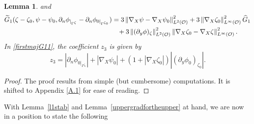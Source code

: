 \documentclass[11pt]{article}
\newtheorem{lemma}[theorem]{Lemma}
\begin{document}
\begin{lemma}
	and 
	\begin{equation}\label{firstmajG12}
		\begin{split}
			\widetilde{G}_1(\zeta-\zeta_0, \psi-\psi_0 ,\partial_n\phi_{|_{\Gamma^{\zeta  }     }}-\partial_n\phi_{0|_{\Gamma^{\zeta_0    }   }} )&=3\left\Vert \nabla_X\psi-\nabla_X\psi_0  \right\Vert_{L^{2}(\mathcal O )}^2+3\left\Vert \nabla_X\zeta_0 \right\Vert_{L^{\infty}(\mathcal O )}^2\widehat{G}_1\\
			&\hspace{0.3cm}+3 \left\Vert (\partial_y\phi)_{\zeta} \right\Vert_{L^{2}(\mathcal O )}^2 \left\Vert \nabla_X\zeta_0-\nabla_X\zeta   \right\Vert_{L^{\infty}(\mathcal O )}^2.\\
		\end{split}
	\end{equation}
	In  \eqref{firstmajG11}, the coefficient $z_3$ is given  by 
	\begin{equation}\label{z1z2z3}
			z_3=\left| \partial_n\phi_{0|_{\Gamma^{\zeta_0       }}} \right|+ \left|\nabla_X\psi_0  \right|+(1+\left| \nabla_X\zeta_0  \right|)\left|(\partial_y\phi_0)_{\zeta_0}  \right|.
	\end{equation}
\end{lemma}
\begin{proof} The proof results from simple (but cumbersome) computations. It is shifted to Appendix \ref {A.1} for ease of reading.  
\end{proof}
With Lemma~\ref{l1stab} and Lemma~\ref{uppergradfortheupper} at hand, we are now in a position to state the following
\end{document}
